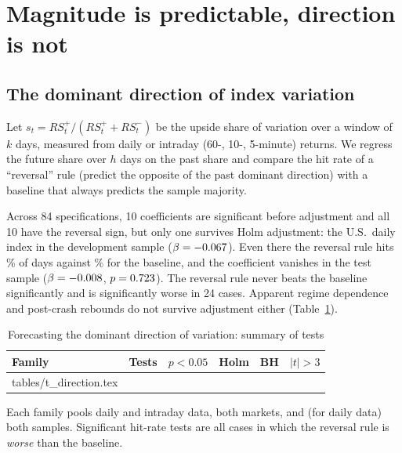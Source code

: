 \documentclass[11pt]{article}
\makeatletter
\newcommand\inputtable[1]{\@@input #1 }
\makeatother
\begin{document}
\section{Magnitude is predictable, direction is not}\label{sec:direction}

\subsection{The dominant direction of index variation}

Let $s_t=RS^{+}_t/(RS^{+}_t+RS^{-}_t)$ be the upside share of variation over a window of $k$ days, measured from daily or intraday (60-, 10-, 5-minute) returns. We regress the future share over $h$ days on the past share and compare the hit rate of a ``reversal'' rule (predict the opposite of the past dominant direction) with a baseline that always predicts the sample majority.

Across 84 specifications, 10 coefficients are significant before adjustment and all 10 have the reversal sign, but only one survives Holm adjustment: the U.S.\ daily index in the development sample ($\beta=-0.067$). Even there the reversal rule hits \dirHit\% of days against \dirBase\% for the baseline, and the coefficient vanishes in the test sample ($\beta=-0.008$, $p=0.723$). The reversal rule never beats the baseline significantly and is significantly worse in 24 cases. Apparent regime dependence and post-crash rebounds do not survive adjustment either (Table~\ref{tab:direction}).

\begin{table}[!htbp]
\centering
\begin{threeparttable}
\caption{Forecasting the dominant direction of variation: summary of tests}\label{tab:direction}
\small
\begin{tabular}{lccccc}
\toprule
Family & Tests & $p<0.05$ & Holm & BH & $|t|>3$ \\
\midrule
\inputtable{tables/t_direction.tex}
\bottomrule
\end{tabular}
\begin{tablenotes}\footnotesize
\item Each family pools daily and intraday data, both markets, and (for daily data) both samples. Significant hit-rate tests are all cases in which the reversal rule is \emph{worse} than the baseline.
\end{tablenotes}
\end{threeparttable}
\end{table}
\end{document}
